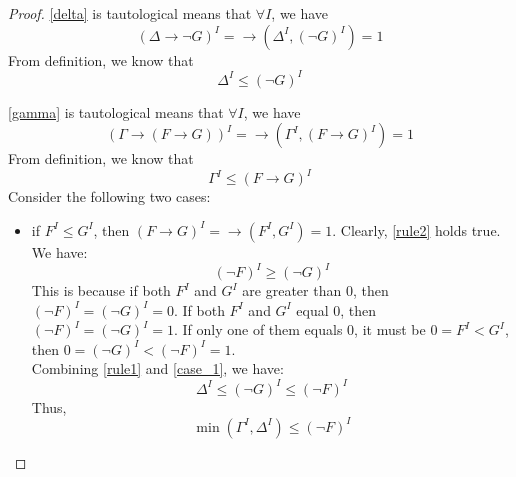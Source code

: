 \begin{proof}
\eqref{delta} is tautological means that $\forall I$, we have 
\begin{equation*}
(\Delta \rightarrow \neg G)^I = \rightarrow (\Delta^I, (\neg G)^I) = 1
\end{equation*}
From definition, we know that 
\begin{equation}
\label{rule1}
\Delta^I \leq (\neg G)^I
\end{equation}

\eqref{gamma} is tautological means that $\forall I$, we have 
\begin{equation*}
(\Gamma \rightarrow (F \rightarrow G))^I = \rightarrow (\Gamma^I, (F \rightarrow G)^I) = 1
\end{equation*}
From definition, we know that 
\begin{equation}
\label{rule2}
\Gamma^I \leq (F \rightarrow G)^I
\end{equation}
Consider the following two cases:
\begin{itemize}
\item if $F^I \leq G^I$, then $(F \rightarrow G)^I = \rightarrow (F^I, G^I) = 1$. Clearly, \eqref{rule2} holds true. We have:
\begin{equation}
\label{case_1}
(\neg F)^I \geq (\neg G)^I
\end{equation}
This is because if both $F^I$ and $G^I$ are greater than 0, then $(\neg F)^I = (\neg G)^I = 0$. If both $F^I$ and $G^I$ equal 0, then $(\neg F)^I = (\neg G)^I = 1$. If only one of them equals 0, it must be $0 = F^I < G^I$, then $0 = (\neg G)^I < (\neg F)^I = 1$. \\
Combining \eqref{rule1} and \eqref{case_1}, we have:
\begin{equation*}
\Delta^I \leq (\neg G)^I \leq (\neg F)^I
\end{equation*}
Thus, 
\begin{equation*}
\min(\Gamma^I, \Delta^I) \leq (\neg F)^I
\end{equation*}



\end{itemize}
\end{proof}
